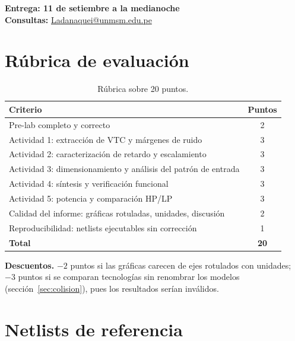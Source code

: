 \documentclass[11pt,a4paper]{article}
\begin{document}
\begin{nota}
\textbf{Entrega: 11 de setiembre a la medianoche} \\
\textbf{Consultas:} \href{mailto:Ladanaquei@unmsm.edu.pe}{Ladanaquei@unmsm.edu.pe}
\end{nota}

\section{Rúbrica de evaluación}

\begin{table}[htbp]
\centering\small
\caption{Rúbrica sobre 20 puntos.}
\begin{tabularx}{\textwidth}{@{}Xc@{}}
\toprule
\textbf{Criterio} & \textbf{Puntos} \\
\midrule
Pre-lab completo y correcto & 2 \\
Actividad 1: extracción de VTC y márgenes de ruido & 3 \\
Actividad 2: caracterización de retardo y escalamiento & 3 \\
Actividad 3: dimensionamiento y análisis del patrón de entrada & 3 \\
Actividad 4: síntesis y verificación funcional & 3 \\
Actividad 5: potencia y comparación HP/LP & 3 \\
Calidad del informe: gráficas rotuladas, unidades, discusión & 2 \\
Reproducibilidad: netlists ejecutables sin corrección & 1 \\
\midrule
\textbf{Total} & \textbf{20} \\
\bottomrule
\end{tabularx}
\end{table}

\noindent\textbf{Descuentos.} $-2$ puntos si las gráficas carecen de ejes rotulados con unidades; $-3$ puntos si se comparan tecnologías sin renombrar los modelos (sección~\ref{sec:colision}), pues los resultados serían inválidos.

\appendix
\section{Netlists de referencia}
\end{document}
